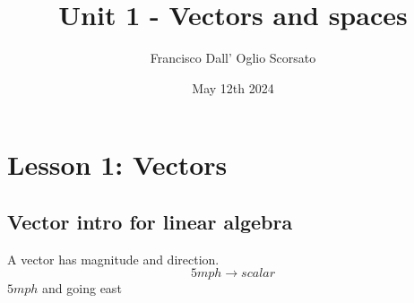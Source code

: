 \documentclass{article}
\title{Unit 1 - Vectors and spaces}
\author{Francisco Dall' Oglio Scorsato}
\date{May 12th 2024}
\begin{document}
\maketitle

\section{Lesson 1: Vectors}

\subsection{Vector intro for linear algebra}

A vector has magnitude and direction.
\[5mph\rightarrow scalar\]
\(5mph\) and going east
\end{document}

